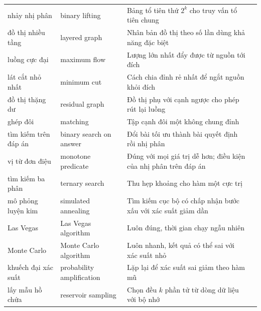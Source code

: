 \documentclass[algorithm.tex]{subfiles}
\begin{document}
\begin{center}
\begin{longtable}{@{}L{3.5cm}L{3.9cm}L{6.2cm}L{1.5cm}@{}}
nhảy nhị phân & binary lifting & Bảng tổ tiên thứ \(2^k\) cho truy vấn tổ tiên chung  & \\
đồ thị nhiều tầng & layered graph & Nhân bản đồ thị theo số lần dùng khả năng đặc biệt & \\
luồng cực đại & maximum flow & Lượng lớn nhất đẩy được từ nguồn tới đích & \\
lát cắt nhỏ nhất & minimum cut & Cách chia đỉnh rẻ nhất để ngắt nguồn khỏi đích & \\
đồ thị thặng dư & residual graph & Đồ thị phụ với cạnh ngược cho phép rút lại luồng & \\
ghép đôi & matching & Tập cạnh đôi một không chung đỉnh & \\
tìm kiếm trên đáp án & binary search on answer & Đổi bài tối ưu thành bài quyết định rồi nhị phân & \\
vị từ đơn điệu & monotone predicate & Đúng với mọi giá trị dễ hơn; điều kiện của nhị phân trên đáp án & \\
tìm kiếm ba phân & ternary search & Thu hẹp khoảng cho hàm một cực trị & \\
mô phỏng luyện kim & simulated annealing & Tìm kiếm cục bộ có chấp nhận bước xấu với xác suất giảm dần & \\
Las Vegas & Las Vegas algorithm & Luôn đúng, thời gian chạy ngẫu nhiên & \\
Monte Carlo & Monte Carlo algorithm & Luôn nhanh, kết quả có thể sai với xác suất nhỏ & \\
khuếch đại xác suất & probability amplification & Lặp lại để xác suất sai giảm theo hàm mũ & \\
lấy mẫu hồ chứa & reservoir sampling & Chọn đều \(k\) phần tử từ dòng dữ liệu với  bộ nhớ & \\
\bottomrule
\end{longtable}
\end{center}
\end{document}
